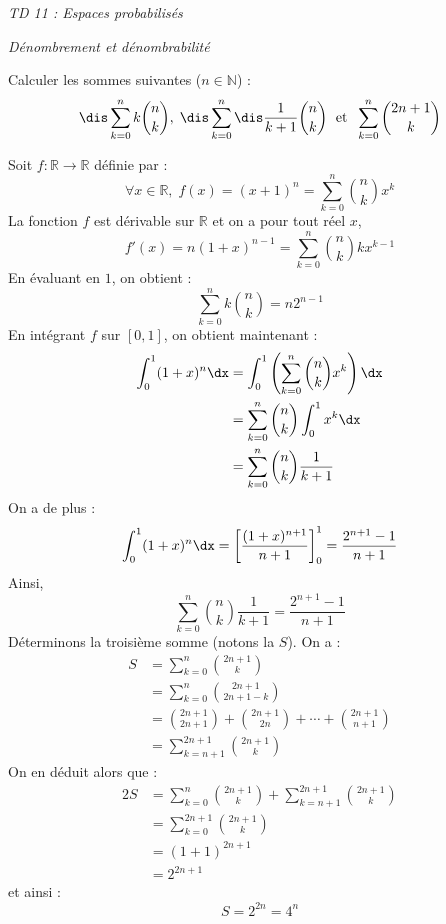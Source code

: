 \documentclass[a4paper,10pt]{report}
\begin{document}
\everymath{\displaystyle}
\begin{center}
\textit{{ {\huge TD 11 : Espaces probabilisés}}}
\end{center}

\bigskip


\begin{center}
\textit{{ {\large Dénombrement et dénombrabilité}}}
\end{center}

\medskip

\begin{Exa} Calculer les sommes suivantes ($n \in \mathbb{N}$) : 
$$\dis\sum_{k=0}^n k \binom{n}{k}, \; \dis\sum_{k=0}^n\dis\frac{1}{k+1} \binom{n}{k} \; \hbox{ et } \; \sum_{k=0}^n \binom{2n+1}{k}$$
\end{Exa}

\corr Soit $f : \mathbb{R} \rightarrow \mathbb{R}$ définie par :
$$ \forall x \in \mathbb{R}, \; f(x)=(x+1)^n = \sum_{k=0}^n \binom{n}{k} x^k$$
La fonction $f$ est dérivable sur $\mathbb{R}$ et on a pour tout réel $x$,
$$ f'(x) = n(1+x)^{n-1}=  \sum_{k=0}^n \binom{n}{k} k x^{k-1} $$
En évaluant en $1$, on obtient :
$$ \sum_{k=0}^n k \binom{n}{k}  = n2^{n-1}$$
En intégrant $f$ sur $[0,1]$, on obtient maintenant :
\begin{align*}
\int_0^1 (1+x)^n \dx & = \int_0^1 \left( \sum_{k=0}^n \binom{n}{k} x^k \right) \dx \\
& = \sum_{k=0}^n \binom{n}{k} \int_0^1 x^k \dx \\
& = \sum_{k=0}^n \binom{n}{k} \dfrac{1}{k+1}
\end{align*}
On a de plus :
$$ \int_0^1 (1+x)^n \dx  = \left[ \dfrac{(1+x)^{n+1}}{n+1} \right]_0^1 = \dfrac{2^{n+1}-1}{n+1}$$
Ainsi,
$$ \sum_{k=0}^n \binom{n}{k} \dfrac{1}{k+1} = \dfrac{2^{n+1}-1}{n+1}$$
Déterminons la troisième somme (notons la $S$). On a :
\begin{align*}
S & = \sum_{k=0}^{n} \binom{2n+1}{k} \\
& = \sum_{k=0}^{n} \binom{2n+1}{2n+1-k} \\
& = \binom{2n+1}{2n+1} + \binom{2n+1}{2n} + \cdots + \binom{2n+1}{n+1} \\
& = \sum_{k=n+1}^{2n+1} \binom{2n+1}{k}
\end{align*}
On en déduit alors que :
\begin{align*}
2S &  = \sum_{k=0}^{n} \binom{2n+1}{k} + \sum_{k=n+1}^{2n+1} \binom{2n+1}{k} \\
& = \sum_{k=0}^{2n+1} \binom{2n+1}{k} \\
& = (1+1)^{2n+1} \\
& = 2^{2n+1} 
\end{align*}
et ainsi :
$$  S= 2^{2n} = 4^n $$
\end{document}
